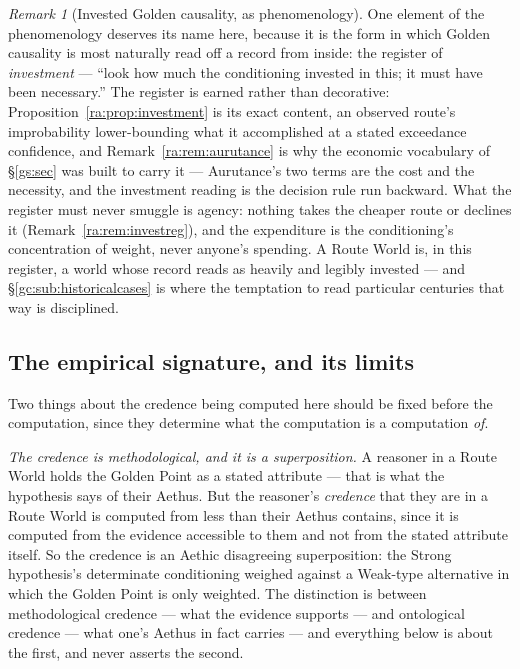 \documentclass[11pt]{article}
\numberwithin{equation}{section}
\theoremstyle{plain}
\theoremstyle{definition}
\theoremstyle{remark}
\newtheorem{remark}[theorem]{Remark}
\begin{document}
\begin{remark}[Invested Golden causality, as phenomenology]
\label{gc:rem:invested}
One element of the phenomenology deserves its name here, because it is
the form in which Golden causality is most naturally read off a record
from inside: the register of \emph{investment} --- ``look how much the
conditioning invested in this; it must have been necessary.'' The
register is earned rather than decorative:
Proposition~\ref{ra:prop:investment} is its exact content, an observed
route's improbability lower-bounding what it accomplished at a stated
exceedance confidence, and Remark~\ref{ra:rem:aurutance} is why the
economic vocabulary of \S\ref{gs:sec} was built to carry it ---
Aurutance's two terms are the cost and the necessity, and the
investment reading is the decision rule run backward. What the register
must never smuggle is agency: nothing takes the cheaper route or
declines it (Remark~\ref{ra:rem:investreg}), and the expenditure is the
conditioning's concentration of weight, never anyone's spending. A
Route World is, in this register, a world whose record reads as heavily
and legibly invested --- and \S\ref{gc:sub:historicalcases} is where
the temptation to read particular centuries that way is disciplined.
\end{remark}

\subsection{The empirical signature, and its limits}\label{gc:sub:credencemethod}

Two things about the credence being computed here should be fixed before
the computation, since they determine what the computation is a
computation \emph{of}.

\emph{The credence is methodological, and it is a superposition.} A
reasoner in a Route World holds the Golden Point as a stated attribute
--- that is what the hypothesis says of their Aethus. But the reasoner's
\emph{credence} that they are in a Route World is computed from less
than their Aethus contains, since it is computed from the evidence
accessible to them and not from the stated attribute itself. So the
credence is an Aethic disagreeing superposition: the Strong hypothesis's
determinate conditioning weighed against a Weak-type alternative in which
the Golden Point is only weighted. The distinction is between
methodological credence --- what the evidence supports --- and
ontological credence --- what one's Aethus in fact carries --- and
everything below is about the first, and never asserts the second.
\end{document}
